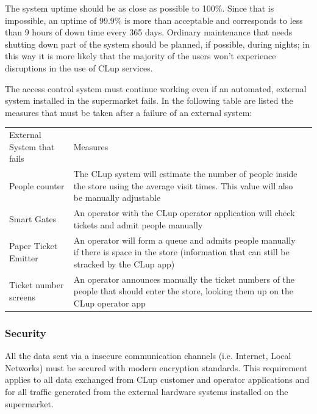 \smallskip

The system uptime should be as close as possible to 100\%. Since that is impossible, an uptime of 99.9\% is more than acceptable and corresponds to less than 9 hours of down time every 365 days.
Ordinary maintenance that needs shutting down part of the system should be planned, if possible, during nights; in this way it is more likely that the majority of the users won't experience disruptions in the use of CLup services.

\smallskip

The access control system must continue working even if an automated, external system installed in the supermarket fails. In the following table are listed the measures that must be taken after a failure of an external system:
\smallskip

\begin{tabular}{C{5cm}L{10.0cm}C{2.0cm}}
    External System that fails & Measures                                                                                                                                         \\
    People counter             & The CLup system will estimate the number of people inside the store using the average visit times. This value will also be manually adjustable   \\
    Smart Gates                & An operator with the CLup operator application will check tickets and admit people manually                                                      \\
    Paper Ticket Emitter       & An operator will form a queue and admits people manually if there is space in the store (information that can still be stracked by the CLup app) \\
    Ticket number screens      & An operator announces manually the ticket numbers of the people that should enter the store, looking them up on the CLup operator app            \\
\end{tabular}
\subsubsection{Security}
All the data sent via a insecure communication channels (i.e. Internet, Local Networks) must be secured with modern encryption standards. This requirement applies to all data exchanged from CLup customer and operator applications and for all traffic generated from the external hardware systems installed on the supermarket.

